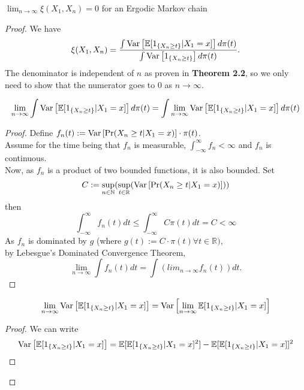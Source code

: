 \begin{theorem}
    $\lim_{n \rightarrow \infty} \xi(X_1, X_{n}) = 0$ for an Ergodic Markov chain
    \begin{proof}
        We have
        \begin{equation*}
            \xi(X_1, X_{n}) = \frac{\int \text{Var}\left[{{\mathbb{E}[1_{\{X_{n} \geq t\}}|X_1=x]}}\right] d\pi(t)}{\int \text{Var}\left[{{1_{\{X_{n} \geq t\}}}}\right] d\pi(t)}.
        \end{equation*}
        The denominator is independent of $n$ as proven in \textbf{Theorem 2.2}, so we only need to show that the numerator goes to 0 as $n \rightarrow \infty$.\\
        \begin{lem}
            $$\lim_{n \rightarrow \infty} \int \text{Var}\left[{{\mathbb{E}[1_{\{X_{n} \geq t\}}|X_1=x]}}\right] d\pi(t) = \int \lim_{n \rightarrow \infty}\text{Var}\left[{{\mathbb{E}[1_{\{X_{n} \geq t\}}|X_1=x]}}\right] d\pi(t)$$
            \begin{proof}
                Define $f_n(t) := \text{Var}\left[{{\Pr(X_{n} \geq t | X_{1} = x)}}\right] \cdot \pi(t)$. \\
                Assume for the time being that $f_n$ is measurable, $\int_{-\infty}^{\infty} f_n < \infty$ and $f_n$ is continuous.\\
                Now, as $f_n$ is a product of two bounded functions, it is also bounded.
                Set
                $$ C:= \sup_{n \in \mathbb{N}} (\sup_{t \in \mathbb{R}} (\text{Var}\left[{{\Pr(X_{n} \geq t | X_{1} = x)}}\right]))$$
                then
                $$\int_{-\infty}^{\infty} f_n(t)dt \leq \int_{-\infty}^{\infty} C\pi(t)dt = C < \infty$$
                As $f_n$ is dominated by $g$ (where $g(t) := C\cdot\pi(t) \forall t \in \mathbb{R})$, \\
                by Lebesgue's Dominated Convergence Theorem,
                $$\lim_{n \rightarrow \infty} \int f_n(t) dt = \int (lim_{n \rightarrow \infty} f_n(t)) dt.$$
            \end{proof}
        \end{lem}
        \begin{lem}
            $$\lim_{n \rightarrow \infty} \text{Var}\left[{{\mathbb{E}[1_{\{X_{n} \geq t\}}|X_1=x]}}\right] = \text{Var}\left[{{\lim_{n \rightarrow \infty} \mathbb{E}[1_{\{X_{n} \geq t\}}|X_1=x]}}\right]$$
            \begin{proof}
                We can write
                \begin{align*}
                    \Var{\mathbb{E}[1_{\{X_{n} \geq t\}}|X_1=x]} &= \mathbb{E}[\mathbb{E}[1_{\{X_{n} \geq t\}}|X_1=x]^2] - \mathbb{E}[\mathbb{E}[1_{\{X_{n} \geq t\}}|X_1=x]]^2 \\

\end{align*}
\end{proof}
\end{lem}
\end{proof}
\end{theorem}
